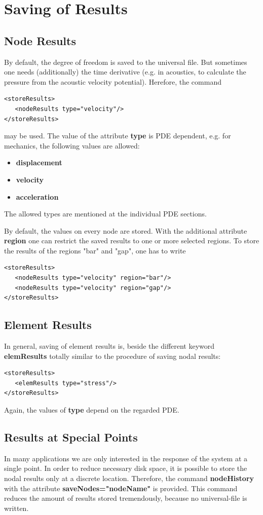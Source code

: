 \chapter{Saving of Results} 

\section{Node Results}
By default, the degree of freedom is saved to the universal file. But
sometimes one needs (additionally) the time derivative (e.g. in
acoustics, to calculate the pressure from the acoustic velocity
potential). Herefore, the command

\begin{verbatim}
<storeResults>
   <nodeResults type="velocity"/>
</storeResults>
\end{verbatim}

may be used. The value of the attribute {\bf type} is PDE dependent,
e.g. for mechanics, the following values are allowed:
\begin{itemize}
\item {\bf displacement}
\item {\bf velocity}    
\item {\bf acceleration}
\end{itemize}
The allowed types are mentioned at the individual PDE sections.

By default, the values on every node are stored. With the additional
attribute {\bf region} one can restrict the saved results to one or
more selected regions.
To store the results of the regions "bar" and "gap", one has to write
\begin{verbatim}
<storeResults>
   <nodeResults type="velocity" region="bar"/>
   <nodeResults type="velocity" region="gap"/>
</storeResults>
\end{verbatim}


\section{Element Results}
In general, saving of element results is, beside the different keyword
{\bf elemResults} totally similar to the procedure of saving nodal
results:
\begin{verbatim}
<storeResults>
   <elemResults type="stress"/>
</storeResults>
\end{verbatim}
Again, the values of {\bf type} depend on the regarded PDE. 


\section{Results at Special Points} 
In many applications we are only interested in the response of the
system at a single point. In order to reduce necessary disk space,
it is possible to store the nodal results only at a discrete
location. Therefore, the command {\bf nodeHistory} with the
attribute {\bf saveNodes="nodeName"} is provided. This command
reduces the amount of results stored tremendously, because no
universal-file is written.

